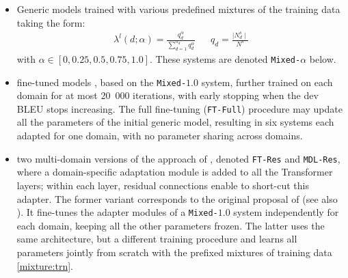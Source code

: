 \documentclass[11pt,a4paper]{article}
\newcommand{\fyTodo}[1]{\Todo[FY:]{\textcolor{orange}{#1}}}
\newcommand{\revision}[1]{#1}
\newcommand{\system}[1]{\texttt{{#1}}}
\begin{document}
\begin{itemize}
\itemsep0em 
\item Generic models trained with various predefined mixtures of the training data taking the form:
\begin{align} \label{mixture:trn}
\lambda^{l}(d;\alpha) = \frac{q_d^{\alpha}}{\displaystyle{\mathop{\sum}_{d=1}^{n_d}q_d^{\alpha}}} &&
q_d = \frac{\mid N^{s}_d \mid}{\displaystyle{N^{s}}} %
\end{align} 
with $\alpha \in [0,0.25,0.5,0.75,1.0]$. These systems are denoted \system{Mixed-$\alpha$} below.
\item fine-tuned models \cite{Luong15stanford,Freitag16fast}, based on the \system{Mixed-$1.0$} system, further trained on each domain for at most 20~000 iterations, with early stopping when the dev BLEU stops increasing. The full fine-tuning (\system{FT-Full}) procedure may update all the parameters of the initial generic model, resulting in six systems each adapted for one domain, with no parameter sharing across domains.

\item two multi-domain versions of the approach of , denoted \system{FT-Res} and \system{MDL-Res}, where a domain-specific adaptation module is added to all the Transformer layers; within each layer, residual connections enable to short-cut this adapter. The former variant corresponds to the original proposal of \citet{Bapna19simple} (see also \cite{Sharaf20metalearning}). It fine-tunes the adapter modules of a \system{Mixed-$1.0$} system independently for each domain, keeping all the other parameters frozen. The latter uses the same architecture, but a different training procedure and learns all parameters jointly from scratch with the prefixed mixtures of training data \ref{mixture:trn}.\fyTodo{Keep this ?}
\end{itemize}
\end{document}
